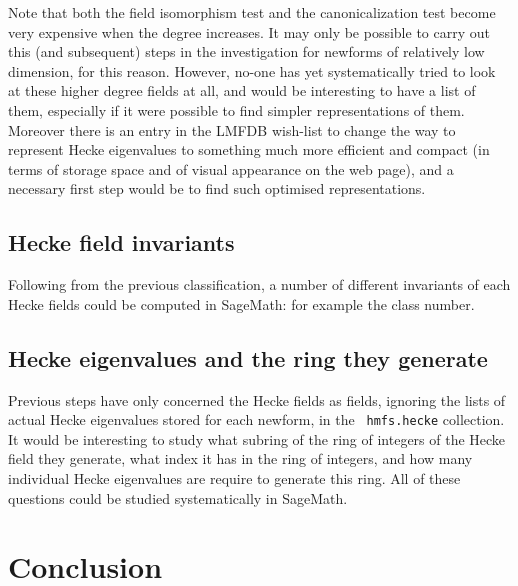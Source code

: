 \documentclass{llncs}
\begin{document}
Note that both the field isomorphism test and the canonicalization
test become very expensive when the degree increases.  It may only be
possible to carry out this (and subsequent) steps in the investigation
for newforms of relatively low dimension, for this reason.  However,
no-one has yet systematically tried to look at these higher degree
fields at all, and would be interesting to have a list of them,
especially if it were possible to find simpler representations of
them.  Moreover there is an entry in the LMFDB wish-list to change the
way to represent Hecke eigenvalues to something much more efficient
and compact (in terms of storage space and of visual appearance on the
web page), and a necessary first step would be to find such optimised
representations.

\subsection{Hecke field invariants} Following from the previous
classification, a number of different invariants of each Hecke fields
could be computed in SageMath: for example the class number.

\subsection{Hecke eigenvalues and the ring they generate} Previous
steps have only concerned the Hecke fields as fields, ignoring the
lists of actual Hecke eigenvalues stored for each newform, in the {\tt
  hmfs.hecke} collection.  It would be interesting to study what
subring of the ring of integers of the Hecke field they generate, what
index it has in the ring of integers, and how many individual Hecke
eigenvalues are require to generate this ring.  All of these questions
could be studied systematically in SageMath.


\section{Conclusion}




\end{document}
